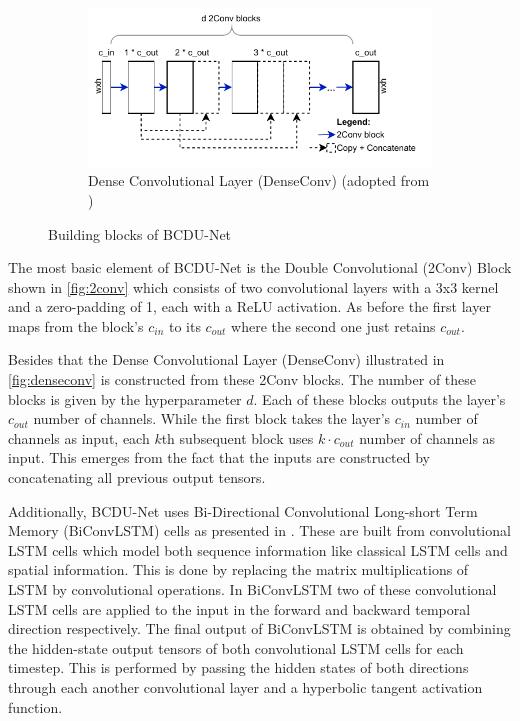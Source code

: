\documentclass{article}
\begin{document}
\begin{figure}
\begin{subfigure}[b]{0.75\textwidth}
		\includegraphics[width=\textwidth]{DenseConv}
		\caption{Dense Convolutional Layer (DenseConv) (adopted from 
			\autocite[4]{BCDUNet})}
		\label{fig:denseconv}
	\end{subfigure}
	\caption{Building blocks of BCDU-Net}
	\label{fig:bcdublocks}
\end{figure}

The most basic element of BCDU-Net is the Double Convolutional (2Conv) Block 
shown in \autoref{fig:2conv} which consists of two convolutional layers with a 
3x3 kernel and a zero-padding of 1, each with a ReLU activation. As before the 
first layer maps from the block's $c_{in}$ to its $c_{out}$ where the second 
one just retains $c_{out}$. \autocite[3]{BCDUNet}

Besides that the Dense Convolutional Layer (DenseConv) illustrated in 
\autoref{fig:denseconv} is constructed from these 2Conv blocks. The number of 
these blocks is given by the hyperparameter $d$. Each of these blocks outputs 
the layer's $c_{out}$ number of channels. While the first block takes the 
layer's $c_{in}$ number of channels as input, each $k$th subsequent block uses 
$k \cdot c_{out}$ number of channels as input. This emerges from the fact that 
the inputs are constructed by concatenating all previous output tensors. 
\autocite[3-4]{BCDUNet}

Additionally, BCDU-Net uses Bi-Directional Convolutional Long-short Term Memory 
(BiConvLSTM) cells as presented in \autocite[6-7]{BiConvLSTM}. These are built 
from convolutional LSTM cells which model both sequence information like 
classical LSTM cells \autocite{LSTM} and spatial information. This is done by 
replacing the matrix multiplications of LSTM by convolutional operations. In 
BiConvLSTM two of these convolutional LSTM cells are applied to the input in 
the forward and backward temporal direction respectively. The final output of 
BiConvLSTM is obtained by combining the hidden-state output tensors of both 
convolutional LSTM cells for each timestep. This is performed by passing the 
hidden states of both directions through each another convolutional layer and a 
hyperbolic tangent activation function.
\autocite[6-7]{BiConvLSTM}
\end{document}
